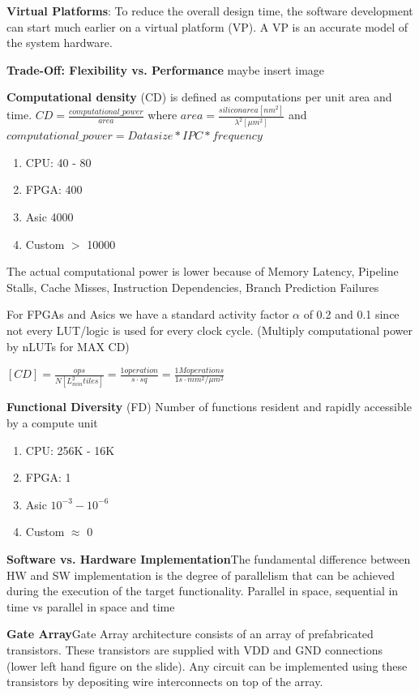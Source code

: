 \documentclass[english]{latex4ei/latex4ei_sheet}
\begin{document}
\textbf{Virtual Platforms}: To reduce the overall design time, the software development can start much earlier on a virtual platform (VP). A VP is an accurate model of the system hardware.

\textbf{Trade-Off: Flexibility vs. Performance} maybe insert image

\textbf{Computational density} (CD) is defined as computations per unit area and time.
$CD = \frac{computational\_power}{area}$ where $area = \frac{siliconarea [nm^2]}{\lambda^2 [\mu m^2]}$ and $computational\_power = Data size * IPC * frequency$

\begin{enumerate}
	\item CPU: 40 - 80
	\item FPGA: 400
	\item Asic 4000
	\item Custom  $>$ 10000
\end{enumerate}

The actual computational power is lower because of Memory Latency, Pipeline Stalls, Cache Misses, Instruction Dependencies, Branch Prediction Failures

For FPGAs and Asics we have a standard activity factor $\alpha$ of 0.2 and 0.1 since not every LUT/logic is used for every clock cycle. (Multiply computational power by nLUTs for MAX CD)

$[CD] = \frac{ops}{N [L_{min}^2 tiles]} = \frac{1 operation}{s \cdot sq}
	= \frac{1M operations}{1s \cdot mm^2 / \mu m^2}$

\textbf{Functional Diversity} (FD) Number of functions resident and rapidly accessible by a compute unit

\begin{enumerate}
	\item CPU: 256K - 16K
	\item FPGA: 1
	\item Asic $10^{-3}  - 10^{-6}$
	\item Custom  $\approx$ 0
\end{enumerate}

\textbf{Software vs. Hardware Implementation}The fundamental difference between HW and SW implementation is the degree of parallelism that can be achieved during the execution of the target functionality. Parallel in space, sequential in time vs parallel in space and time

\textbf{Gate Array}Gate Array architecture consists of an array of prefabricated transistors. These transistors are supplied with VDD and GND connections (lower left hand figure on the slide). Any circuit can be implemented using these transistors by depositing wire interconnects on top of the array.
\end{document}
